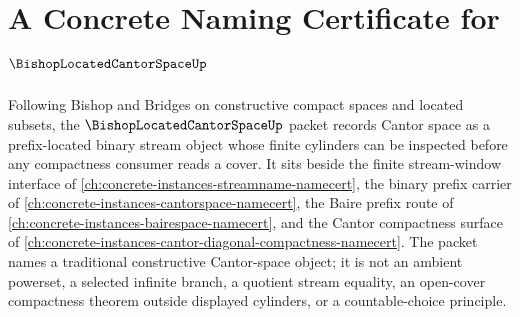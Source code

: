 \chapter{A Concrete Naming Certificate for $\BishopLocatedCantorSpaceUp$}
\label{ch:concrete-instances-bishop-located-cantor-space-namecert}

Following Bishop and Bridges on constructive compact spaces and located subsets, the $\BishopLocatedCantorSpaceUp$ packet records Cantor space as a prefix-located binary stream object whose finite cylinders can be inspected before any compactness consumer reads a cover. It sits beside the finite stream-window interface of \autoref{ch:concrete-instances-streamname-namecert}, the binary prefix carrier of \autoref{ch:concrete-instances-cantorspace-namecert}, the Baire prefix route of \autoref{ch:concrete-instances-bairespace-namecert}, and the Cantor compactness surface of \autoref{ch:concrete-instances-cantor-diagonal-compactness-namecert}. The packet names a traditional constructive Cantor-space object; it is not an ambient powerset, a selected infinite branch, a quotient stream equality, an open-cover compactness theorem outside displayed cylinders, or a countable-choice principle.

